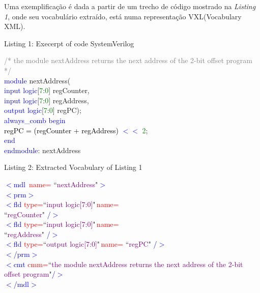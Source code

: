 \documentclass[12pt, twocolumn, a4paper]{article}
\begin{document}
Uma exemplificação é dada a partir de um trecho de código mostrado na \textit{Listing 1}, onde seu vocabulário extraído, está numa representação VXL(Vocabulary XML).
\begin{center}
{\footnotesize Listing 1: Execerpt of code SystemVerilog}
\end{center}
{\footnotesize
\textcolor{gray}{/* the module nextAddress returns the}
\textcolor{gray}{next address of the 2-bit offset program}
\textcolor{gray}{*/}\\
\textcolor{blue}{module} nextAddress(\\\textcolor{blue}{\qquad input logic}[\textcolor{green}{7}:\textcolor{green}{0}] regCounter,\\ \textcolor{blue}{\qquad input logic}[\textcolor{green}{7}:\textcolor{green}{0}] regAddress,\\
\textcolor{blue}{\qquad output logic}[\textcolor{green}{7}:\textcolor{green}{0}] regPC);\\
\textcolor{blue}{\quad always\_comb begin}\\
\textcolor{black}{\qquad regPC = (regCounter + regAddress)} \textcolor{blue}{$<<$} \textcolor{green}{2};\\
\textcolor{blue}{\quad end}\\
\textcolor{blue}{endmodule}: nextAddress\\
\begin{center}
{\footnotesize Listing 2: Extracted Vocabulary of Listing 1}
\end{center}}
{\footnotesize
\textcolor{blue}{$<$mdl} \textcolor{red}{\,name=} ``\textcolor{purple}{nextAddress}"\textcolor{blue}{$>$}\\
\textcolor{blue}{\quad$<$prm$>$}\\
\textcolor{blue}{\qquad$<$fld} \textcolor{red}{type=}``\textcolor{purple}{input logic[7:0]}"\textcolor{red}{\,name=}\\\textcolor{black}{\qquad ``}\textcolor{purple}{regCounter}" \textcolor{blue}{/$>$}\\
\textcolor{blue}{\qquad$<$fld} \textcolor{red}{type=}``\textcolor{purple}{input logic[7:0]}"\textcolor{red}{\,name=}\\\textcolor{black}{\qquad ``}\textcolor{purple}{regAddress}" \textcolor{blue}{/$>$}\\
\textcolor{blue}{\qquad$<$fld} \textcolor{red}{type=}``\textcolor{purple}{output logic[7:0]}"\textcolor{red}{\,name=} ``\textcolor{purple}{regPC}" \textcolor{blue}{/$>$}\\
\textcolor{blue}{\quad$<$/prm$>$}\\
\textcolor{blue}{\quad$<$cmt} \textcolor{red}{cmm=}``\textcolor{purple}{the module nextAddress returns the next address of the 2-bit offset program}"\textcolor{blue}{/$>$}\\
\textcolor{blue}{$<$/mdl$>$}}\\
\end{document}
